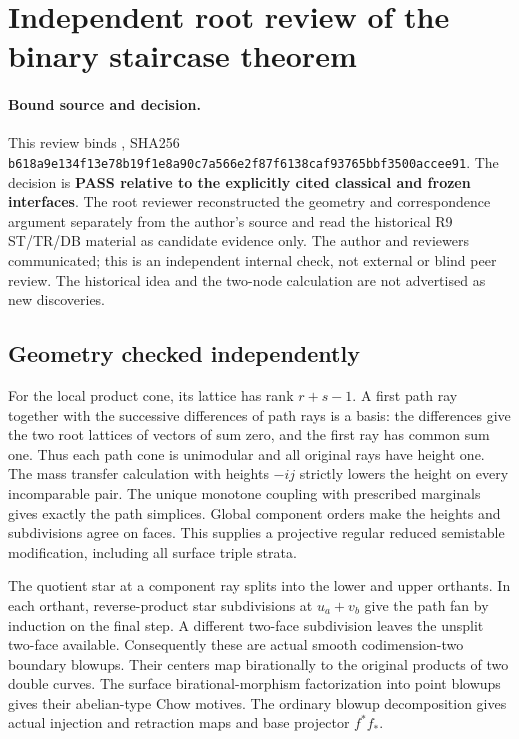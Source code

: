 \section{Independent root review of the binary staircase theorem}
\label{r20pxroot:review}

\paragraph{Bound source and decision.}
This review binds
, SHA256
\texttt{b618a9e134f13e78b19f1e8a90c7a566e2f87f6138caf93765bbf3500accee91}.
The decision is \textbf{PASS relative to the explicitly cited classical
and frozen interfaces}.  The root reviewer reconstructed the geometry
and correspondence argument separately from the author's source and
read the historical R9 ST/TR/DB material as candidate evidence only.
The author and reviewers communicated; this is an independent internal
check, not external or blind peer review.  The historical idea and the
two-node calculation are not advertised as new discoveries.

\subsection{Geometry checked independently}

For the local product cone, its lattice has rank $r+s-1$.  A first
path ray together with the successive differences of path rays is a
basis: the differences give the two root lattices of vectors of sum
zero, and the first ray has common sum one.  Thus each path cone is
unimodular and all original rays have height one.  The mass transfer
calculation with heights $-ij$ strictly lowers the height on every
incomparable pair.  The unique monotone coupling with prescribed
marginals gives exactly the path simplices.  Global component orders
make the heights and subdivisions agree on faces.  This supplies a
projective regular reduced semistable modification, including all
surface triple strata.

The quotient star at a component ray splits into the lower and upper
orthants.  In each orthant, reverse-product star subdivisions at
$u_a+v_b$ give the path fan by induction on the final step.  A
different two-face subdivision leaves the unsplit two-face available.
Consequently these are actual smooth codimension-two boundary
blowups.  Their centers map birationally to the original products of
two double curves.  The surface birational-morphism factorization
into point blowups gives their abelian-type Chow motives.  The
ordinary blowup decomposition gives actual injection and retraction
maps and base projector $f^*f_*$.

